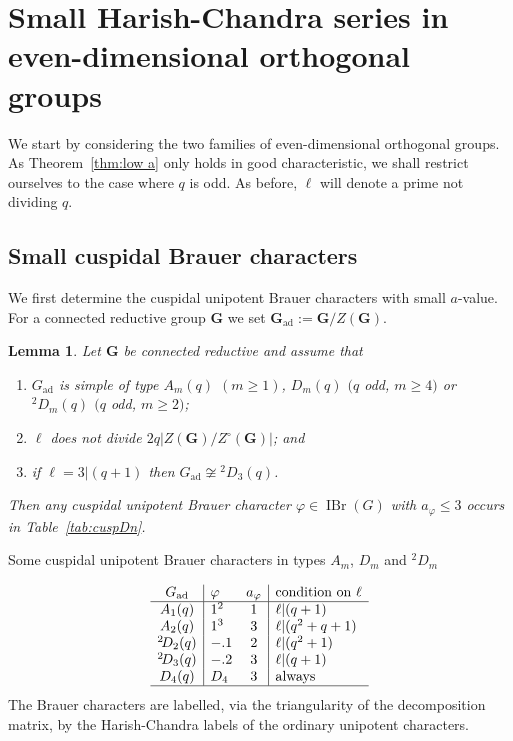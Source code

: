\documentclass[12pt,leqno,a4paper]{amsart}
\newcommand{\bG}{{\mathbf{G}}}
\newcommand{\IBr}{{\operatorname{IBr}}}
\newcommand{\ad}{{\operatorname{ad}}}
\newcommand{\tw}[1]{{}^{#1}\!}
\let\vhi=\varphi
\newtheorem{lem}[thm]{Lemma}
\theoremstyle{remark}
\begin{document}
\section{Small Harish-Chandra series in even-dimensional orthogonal groups}
\label{sec:orth-even}
We start by considering the two families of even-dimensional orthogonal groups.
As Theorem~\ref{thm:low a} only holds in good characteristic, we shall
restrict ourselves to the case where $q$ is odd. As before, $\ell$ will denote
a prime not dividing $q$.

\subsection{Small cuspidal Brauer characters}
We first determine the cuspidal unipotent Brauer characters with small
$a$-value. For a connected reductive group $\bG$ we set $\bG_\ad:= \bG/Z(\bG)$.

\begin{lem}   \label{lem:cuspDn}
 Let $\bG$ be connected reductive and assume that
 \begin{enumerate}
   \item[\rm(1)] $G_\ad$ is simple of type $A_m(q)$ $(m\ge1)$,
 $D_m(q)$ $(q$ odd, $m\ge4)$ or $\tw2D_m(q)$ $(q$ odd, $m\ge2)$;
   \item[\rm(2)] $\ell$ does not divide $2q|Z(\bG)/Z^\circ(\bG)|$; and
   \item[\rm(3)] if $\ell=3|(q+1)$ then $G_\ad\not\cong\tw2D_3(q)$.
 \end{enumerate}
 Then any cuspidal unipotent Brauer character $\vhi\in\IBr(G)$
 with $a_\vhi\le3$ occurs in Table~\ref{tab:cuspDn}.
\end{lem}

\begin{table}[ht]
\caption{Some cuspidal unipotent Brauer characters in types $A_m$, $D_m$ and $\tw2D_m$}   \label{tab:cuspDn}
\[\begin{array}{c|lc|l}
 G_\ad& \vhi& a_\vhi& \text{condition on $\ell$}\\
\hline
     A_1(q)&  1^2&  1& \ell|(q+1)\\
     A_2(q)&  1^3&  3& \ell|(q^2+q+1)\\
 \tw2D_2(q)& -.1&  2& \ell|(q^2+1)\\
 \tw2D_3(q)& -.2&  3& \ell|(q+1)\\
     D_4(q)&   D_4&  3& \text{always}\\
\hline
\end{array}\]
\scriptsize{The Brauer characters are labelled, via the triangularity of the
decomposition\\ matrix, by the Harish-Chandra labels of the ordinary unipotent
characters.}
\end{table}
\end{document}
